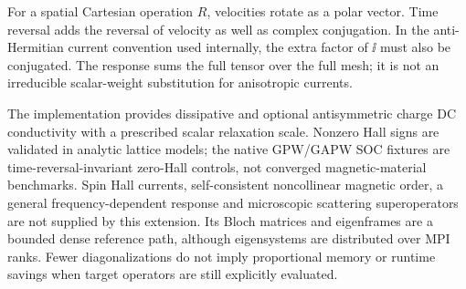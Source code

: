 For a spatial Cartesian operation $R$, velocities rotate as a polar
vector. Time reversal adds the reversal of velocity as well as complex
conjugation. In the anti-Hermitian current convention used internally,
the extra factor of $\ii$ must also be conjugated.
The response sums the full tensor over the full mesh; it is not an
irreducible scalar-weight substitution for anisotropic currents.

The implementation provides dissipative and optional antisymmetric
charge DC conductivity with a prescribed scalar relaxation scale.
Nonzero Hall signs are validated in analytic lattice models; the native
GPW/GAPW SOC fixtures are time-reversal-invariant zero-Hall controls,
not converged magnetic-material benchmarks. Spin Hall currents,
self-consistent noncollinear magnetic order, a general
frequency-dependent response and microscopic scattering superoperators
are not supplied by this extension.
Its Bloch matrices and eigenframes are a bounded dense reference path,
although eigensystems are distributed over MPI ranks.
Fewer diagonalizations do not imply proportional memory or runtime
savings when target operators are still explicitly evaluated.
